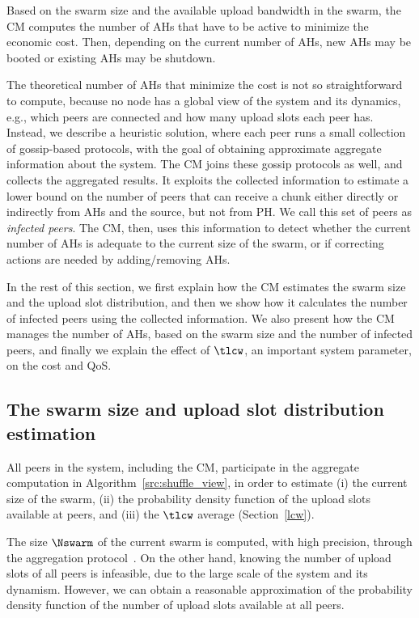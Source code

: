 Based on the swarm size and the available upload bandwidth in the swarm, the CM
computes the number of AHs that have to be active to minimize the economic
cost. Then, depending on the current number of AHs, new AHs may be booted or
existing AHs may be shutdown.

The theoretical number of AHs that minimize the cost is not so straightforward
to compute, because no node has a global view of the system and its dynamics,
e.g., which peers are connected and how many upload slots each peer has.
Instead, we describe a heuristic solution, where each peer runs a small
collection of gossip-based protocols, with the goal of obtaining approximate
aggregate information about the system. The CM joins these gossip protocols as
well, and collects the aggregated results. It exploits the collected
information to estimate a lower bound on the number of peers that can receive
a chunk either directly or indirectly from AHs and the source, but not from
PH. We call this set of peers as {\em infected peers}. The CM, then, uses this
information to detect whether the current number of AHs is adequate to the
current size of the swarm, or if correcting actions are needed by
adding/removing AHs.

In the rest of this section, we first explain how the CM estimates the swarm size
and the upload slot distribution, and then we show how it calculates the
number of infected peers using the collected information. We also present how
the CM manages the number of AHs, based on the swarm size and the number of
infected peers, and finally we explain the effect of $\tlcw$, an important
system parameter, on the cost and QoS.

\subsection{The swarm size and upload slot distribution estimation}

All peers in the system, including the CM, participate in the aggregate computation
in Algorithm~\ref{src:shuffle_view}, in order to
estimate (i) the current size of
the swarm, (ii) the probability density function of the upload slots available
at peers, and (iii) the $\tlcw$ average (Section~\ref{lcw}).

The size $\Nswarm$ of the current swarm is computed, with high precision,
through the aggregation protocol~\cite{aggregation}. On the other hand, knowing the
number of upload slots of all peers is infeasible, due to the large scale of
the system and its dynamism. However, we can obtain a reasonable approximation
of the probability density function of the number of upload slots available at
all peers.

